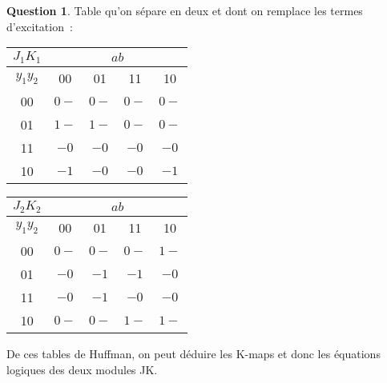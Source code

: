 \documentclass[11pt,a4paper]{article}
\theoremstyle{definition}%
\newtheorem{Q}{Question}[] %
\begin{document}
\begin{Q}
{	Table qu'on sépare en deux et dont on remplace les termes d'excitation~:
	\begin{center}
		\begin{tabular}{|c|c|c|c|c|}\hline
		$J_1K_1$ & \multicolumn{4}{c|}{$ab$} \\ \hline
		$y_1y_2$ & 00 & 01 & 11 & 10 \\ \hline
		00 & $0-$ & $0-$ & $0-$ & $0-$ \\ \hline
		01 & $1-$ & $1-$ & $0-$ & $0-$ \\ \hline
		11 & $-0$ & $-0$ & $-0$ & $-0$ \\ \hline
		10 & $-1$ & $-0$ & $-0$ & $-1$ \\ \hline
		\end{tabular}
	\end{center}

	\begin{center}
		\begin{tabular}{|c|c|c|c|c|}\hline
		$J_2K_2$ & \multicolumn{4}{c|}{$ab$} \\ \hline
		$y_1y_2$ & 00 & 01 & 11 & 10 \\ \hline
		00 & $0-$ & $0-$ & $0-$ & $1-$ \\ \hline
		01 & $-0$ & $-1$ & $-1$ & $-0$ \\ \hline
		11 & $-0$ & $-1$ & $-0$ & $-0$ \\ \hline
		10 & $0-$ & $0-$ & $1-$ & $1-$ \\ \hline
		\end{tabular}
	\end{center}

	De ces tables de Huffman, on peut déduire les K-maps et donc les équations logiques des deux modules JK.

	\begin{center}
	\end{center}
	\begin{center}
	\end{center}
	\begin{center}
	\end{center}
	\begin{center}
	\end{center}


}


\end{Q}
\end{document}
